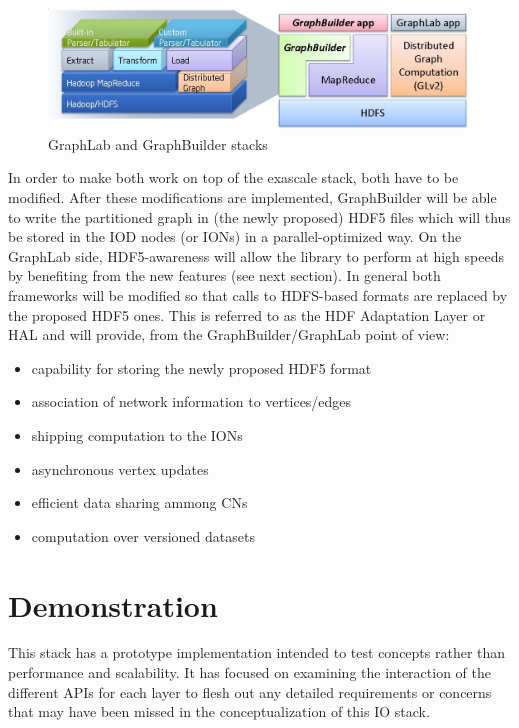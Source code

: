 \documentclass[conference]{IEEEtran}
\begin{document}
\begin{figure}[htbp]
\centering
\includegraphics[width=\columnwidth]{images/graphlab-and-graphbuilder.png}
\caption{GraphLab and GraphBuilder stacks}
\label{fig:graphlab-graphbuilder}
\end{figure}

In order to make both work on top of the exascale stack, both have to be
modified. After these modifications are implemented, GraphBuilder will
be able to write the partitioned graph in (the newly proposed) HDF5
files which will thus be stored in the IOD nodes (or IONs) in a
parallel-optimized way. On the GraphLab side, HDF5-awareness will allow
the library to perform at high speeds by benefiting from the new
features (see next section). In general both frameworks will be modified
so that calls to HDFS-based formats are replaced by the proposed HDF5
ones. This is referred to as the HDF Adaptation Layer or HAL and will
provide, from the GraphBuilder/GraphLab point of view:

\begin{itemize}
\itemsep1pt\parskip0pt
\item
  capability for storing the newly proposed HDF5 format
\item
  association of network information to vertices/edges
\item
  shipping computation to the IONs
\item
  asynchronous vertex updates
\item
  efficient data sharing ammong CNs
\item
  computation over versioned datasets
\end{itemize}

\section{Demonstration}
This stack has a prototype implementation intended to test concepts rather
than performance and scalability. It has focused on examining the interaction
of the different APIs for each layer to flesh out any detailed requirements
or concerns that may have been missed in the conceptualization of this IO stack.
\end{document}
